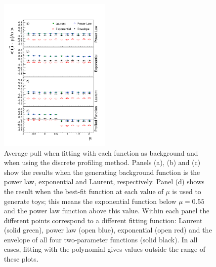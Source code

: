 %
\begin{figure}[tbp]
\centering
\includegraphics[width=0.48\textwidth]{functions/FirstOrderFunctions.pdf}
\caption{Average pull when fitting with each function as background and when
using the discrete profiling method. Panels (a), (b) and (c) show the results
when the generating background function is the power law, exponential and Laurent,
respectively. Panel (d) shows the result when the best-fit function at each
value of $\mu$ is used to generate toys; this means the exponential function
below $\mu = 0.55$ and the power law function above this value. Within each panel the different
points correspond to a different fitting function: Laurent (solid green), power law (open blue), exponential (open red) and the envelope of all four two-parameter functions (solid black). In all cases,
fitting with the polynomial gives values outside the range of these plots.}
\label{fig:functions:firstorderbias}
\end{figure}


